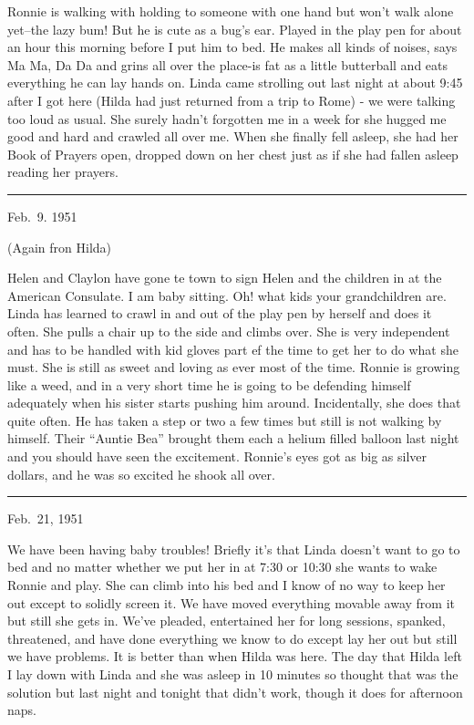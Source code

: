 \documentclass[]{book}
\begin{document}
Ronnie is walking with holding to someone with one hand but won't walk alone yet--the lazy bum! But he is cute as a bug's ear. Played in the play pen for about an hour this morning before I put him to bed. He makes all kinds of noises, says Ma Ma, Da Da and grins all over the place-is fat as a little butterball and eats everything he can lay hands on. Linda came strolling out last night at about 9:45 after I got here (Hilda had just returned from a trip to Rome) - we were talking too loud as usual. She surely hadn't forgotten me in a week for she hugged me good and hard and crawled all over me. When she finally fell asleep, she had her Book of Prayers open, dropped down on her chest just as if she had fallen asleep reading her prayers.

\begin{center}\rule{0.5\linewidth}{\linethickness}\end{center}

Feb.~9. 1951

(Again fron Hilda)

Helen and Claylon have gone te town to sign Helen and the children in at the American Consulate. I am baby sitting. Oh! what kids your grandchildren are. Linda has learned to crawl in and out of the play pen by herself and does it often. She pulls a chair up to the side and climbs over. She is very independent and has to be handled with kid gloves part ef the time to get her to do what she must. She is still as sweet and loving as ever most of the time. Ronnie is growing like a weed, and in a very short time he is going to be defending himself adequately when his sister starts pushing him around. Incidentally, she does that quite often. He has taken a step or two a few times but still is not walking by himself. Their ``Auntie Bea'' brought them each a helium filled balloon last night and you should have seen the excitement. Ronnie's eyes got as big as silver dollars, and he was so excited he shook all over.

\begin{center}\rule{0.5\linewidth}{\linethickness}\end{center}

Feb.~21, 1951

We have been having baby troubles! Briefly it's that Linda doesn't want to go to bed and no matter whether we put her in at 7:30 or 10:30 she wants to wake Ronnie and play. She can climb into his bed and I know of no way to keep her out except to solidly screen it. We have moved everything movable away from it but still she gets in. We've pleaded, entertained her for long sessions, spanked, threatened, and have done everything we know to do except lay her out but still we have problems. It is better than when Hilda was here. The day that Hilda left I lay down with Linda and she was asleep in 10 minutes so thought that was the solution but last night and tonight that didn't work, though it does for afternoon naps.
\end{document}
